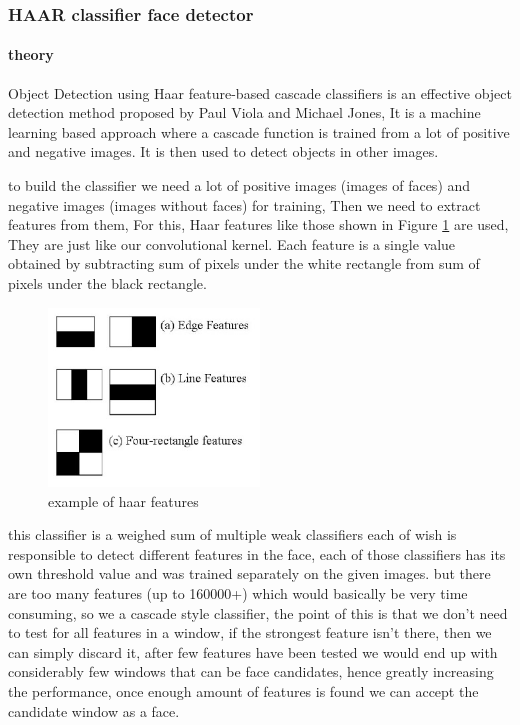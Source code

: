 \subsubsection{HAAR classifier face detector}

\paragraph{theory}
Object Detection using Haar feature-based cascade classifiers is an effective object detection method proposed by Paul Viola and Michael Jones\cite{haar}, It is a machine learning based approach where a cascade function is trained from a lot of positive and negative images. It is then used to detect objects in other images.

to build the classifier we need a lot of positive images (images of faces) and negative images (images without faces) for training, Then we need to extract features from them, For this, Haar features like those shown in Figure \ref{fig:haar_features} are used, They are just like our convolutional kernel. Each feature is a single value obtained by subtracting sum of pixels under the white rectangle from sum of pixels under the black rectangle.

\begin{figure}
	\centering
	\includegraphics[width=0.5\textwidth]{images/haar_features.jpg}
	\caption{example of haar features}
	\label{fig:haar_features}
\end{figure}

this classifier is a weighed sum of multiple weak classifiers each of wish is responsible to detect different features in the face, each of those classifiers has its own threshold value and was trained separately on the given images.
but there are too many features (up to 160000+) which would basically be very time consuming, so we a cascade style classifier, the point of this is that we don't need to test for all features in a window, if the strongest feature isn't there, then we can simply discard it, after few features have been tested we would end up with considerably few windows that can be face candidates, hence greatly increasing the performance, once enough amount of features is found we can accept the candidate window as a face.

